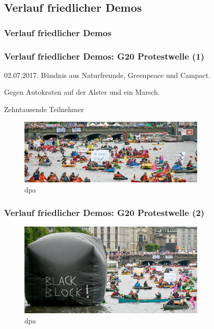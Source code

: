 \documentclass[]{beamer}
\begin{document}
	\begin{frame}
	\subsection{Verlauf friedlicher Demos}
	\frametitle{Verlauf friedlicher Demos}
\end{frame}

	\begin{frame}
	\frametitle{Verlauf friedlicher Demos: G20 Protestwelle (1)}
		02.07.2017. Bündnis aus Naturfreunde, Greenpeace und Campact.\par
		Gegen Autokraten auf der Alster und ein Marsch.\par 
		Zehntausende Teilnehmer
	\begin{figure}
		\renewcommand{\figurename}{Foto} 
		\includegraphics[width=0.8\textwidth]{images/g20-protestwelle1}
		\caption{dpa}
	\end{figure}
\end{frame}

	\begin{frame}
	\frametitle{Verlauf friedlicher Demos: G20 Protestwelle (2)}
	\begin{figure}
		\renewcommand{\figurename}{Foto} 
		\includegraphics[width=0.8\textwidth]{images/g20-protestwelle2}
		\caption{dpa}
	\end{figure}
\end{frame}
\end{document}
